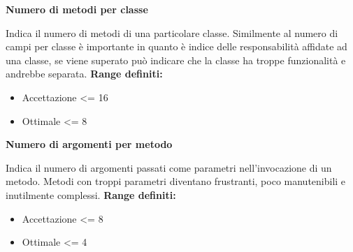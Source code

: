 {\large \textbf{Numero di metodi per classe}\par} 
Indica il numero di metodi di una particolare classe. Similmente al numero di campi per classe è importante in quanto è indice delle responsabilità affidate ad una classe, se viene superato può indicare che la classe ha troppe funzionalità e andrebbe separata.
\textbf{Range definiti:}
\begin{itemize}
	\item Accettazione \textless = 16
	\item Ottimale \textless = 8
\end{itemize}

{\large \textbf{Numero di argomenti per metodo}\par} 
Indica il numero di argomenti passati come parametri nell'invocazione di un metodo. Metodi con troppi parametri diventano frustranti, poco manutenibili e inutilmente complessi.
\textbf{Range definiti:}
\begin{itemize}
	\item Accettazione \textless = 8
	\item Ottimale \textless = 4
\end{itemize}

